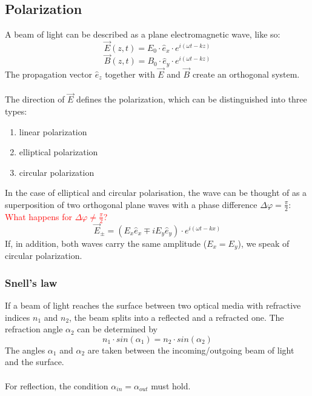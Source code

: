 \subsection{Polarization}

A beam of light can be described as a plane electromagnetic wave, like so:
\begin{equation}
    \vec E(z,t)=E_0\cdot\hat e_x\cdot e^{i(\omega t-kz)}
\end{equation}
\begin{equation}
    \vec B(z,t)=B_0\cdot\hat e_y\cdot e^{i(\omega t-kz)}
\end{equation}
The propagation vector $\hat e_z$ together with $\vec E$ and $\vec B$ create 
an orthogonal system. \\ \\ The direction of $\vec E$ defines the polarization, 
which can be distinguished into three types:
\begin{enumerate}
    \centering
    \item linear polarization
    \item elliptical polarization
    \item circular polarization
\end{enumerate}
In the case of elliptical and circular polarisation,
the wave can be  thought of as a superposition of two
orthogonal plane waves with a phase difference $\Delta\varphi=\frac{\pi}{2}$:
\textcolor{red}{What happens for $\Delta\varphi\neq\frac{\pi}{2}$?}
\begin{equation}
    \vec E_\pm=(E_x\hat e_x\mp iE_y\hat e_y)\cdot e^{i(\omega t-kx)}
\end{equation}
If, in addition, both waves carry the same amplitude ($E_x=E_y$),
we speak of circular polarization.

\subsubsection{Snell's law}
If a beam of light reaches the surface between two optical media with
refractive indices $n_1$ and $n_2$, the beam splits into a reflected and a
refracted one. The refraction angle $\alpha_2$ can be determined by
\begin{equation}
    n_1\cdot sin(\alpha_1)=n_2\cdot sin(\alpha_2)
\end{equation}
The angles $\alpha_1$ and $\alpha_2$ are taken between the
incoming/outgoing beam of light and the surface. \\ \\ For reflection,
the condition $\alpha_{in}=\alpha_{out}$ must hold.

